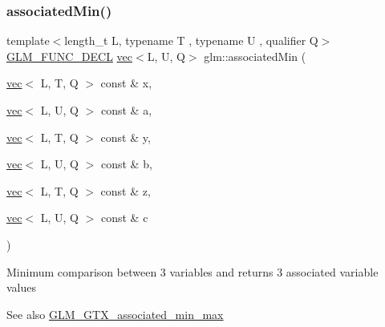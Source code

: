 \subsubsection{\texorpdfstring{associated\+Min()}{associatedMin()}\hspace{0.1cm}{\footnotesize\ttfamily [6/10]}}
{\footnotesize\ttfamily template$<$length\+\_\+t L, typename T , typename U , qualifier Q$>$ \\
\mbox{\hyperlink{setup_8hpp_ab2d052de21a70539923e9bcbf6e83a51}{G\+L\+M\+\_\+\+F\+U\+N\+C\+\_\+\+D\+E\+CL}} \mbox{\hyperlink{structglm_1_1vec}{vec}}$<$L, U, Q$>$ glm\+::associated\+Min (\begin{DoxyParamCaption}\item[{\mbox{\hyperlink{structglm_1_1vec}{vec}}$<$ L, T, Q $>$ const \&}]{x,  }\item[{\mbox{\hyperlink{structglm_1_1vec}{vec}}$<$ L, U, Q $>$ const \&}]{a,  }\item[{\mbox{\hyperlink{structglm_1_1vec}{vec}}$<$ L, T, Q $>$ const \&}]{y,  }\item[{\mbox{\hyperlink{structglm_1_1vec}{vec}}$<$ L, U, Q $>$ const \&}]{b,  }\item[{\mbox{\hyperlink{structglm_1_1vec}{vec}}$<$ L, T, Q $>$ const \&}]{z,  }\item[{\mbox{\hyperlink{structglm_1_1vec}{vec}}$<$ L, U, Q $>$ const \&}]{c }\end{DoxyParamCaption})}

Minimum comparison between 3 variables and returns 3 associated variable values \begin{DoxySeeAlso}{See also}
\mbox{\hyperlink{group__gtx__associated__min__max}{G\+L\+M\+\_\+\+G\+T\+X\+\_\+associated\+\_\+min\+\_\+max}} 
\end{DoxySeeAlso}
\mbox{\label{group__gtx__associated__min__max_ga432224ebe2085eaa2b63a077ecbbbff6}} 
